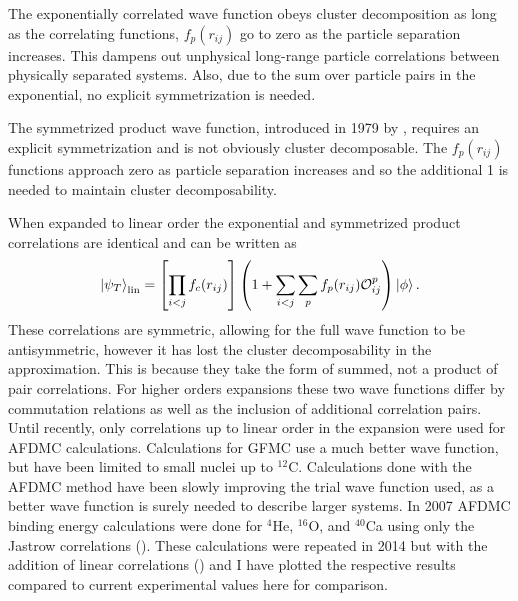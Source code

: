 The exponentially correlated wave function obeys cluster decomposition as long as the correlating functions, $f_p(r_{ij})$ go to zero as the particle separation increases. This dampens out unphysical long-range particle correlations between physically separated systems. Also, due to the sum over particle pairs in the exponential, no explicit symmetrization is needed.

The symmetrized product wave function, introduced in 1979 by \cite{pandharipande1979}, requires an explicit symmetrization and is not obviously cluster decomposable. The $f_p(r_{ij})$ functions approach zero as particle separation increases and so the additional 1 is needed to maintain cluster decomposability.

When expanded to linear order the exponential and symmetrized product correlations are identical and can be written as
\begin{equation}
   \left| \psi_T \right>_\text{lin} = \left[\prod\limits_{i<j}f_c(r_{ij})\right] \left(1+\sum\limits_{i<j}\sum\limits_pf_p(r_{ij})\mathcal{O}_{ij}^p\right) \left| \phi \right>.
   \label{equ:linearcorr}
\end{equation}
These correlations are symmetric, allowing for the full wave function to be antisymmetric, however it has lost the cluster decomposability in the approximation. This is because they take the form of summed, not a product of pair correlations. For higher orders expansions these two wave functions differ by commutation relations as well as the inclusion of additional correlation pairs. Until recently, only correlations up to linear order in the expansion were used for AFDMC calculations. Calculations for GFMC use a much better wave function, but have been limited to small nuclei up to $^{12}$C. Calculations done with the AFDMC method have been slowly improving the trial wave function used, as a better wave function is surely needed to describe larger systems. In 2007 AFDMC binding energy calculations were done for $^4$He, $^{16}$O, and $^{40}$Ca using only the Jastrow correlations (\cite{gandolfi2007}). These calculations were repeated in 2014 but with the addition of linear correlations (\cite{gandolfi2014}) and I have plotted the respective results compared to current experimental values here for comparison.
